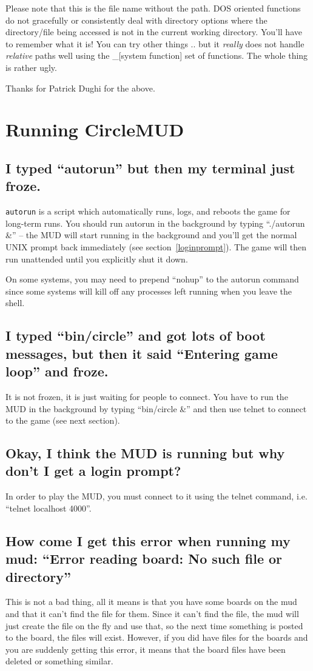 \documentclass[11pt]{article}
\begin{document}
Please note that this is the file name without the path.  DOS oriented functions do not gracefully or consistently deal with directory options where the directory/file being accessed is not in the current working directory. You'll have to remember what it is! You can try other things .. but it {\em really} does not handle {\em relative} paths well using the \_[system function] set of functions.  The whole thing is rather ugly.
\par
Thanks for Patrick Dughi for the above.

\section{Running CircleMUD}
\subsection{I typed ``autorun'' but then my terminal just froze.}
\texttt{autorun} is a script which automatically runs, logs, and reboots the game for long-term runs.  You should run autorun in the background by typing ``./autorun \&'' -- the MUD will start running in the background and you'll get the normal UNIX prompt back immediately (see section~\vref{loginprompt}). The game will then run unattended until you explicitly shut it down.
\par
On some systems, you may need to prepend ``nohup'' to the autorun command since some systems will kill off any processes left running when you leave the shell.

\subsection{I typed ``bin/circle'' and got lots of boot messages, but then it said ``Entering game loop'' and froze.}
It is not frozen, it is just waiting for people to connect.  You have to run the MUD in the background by typing ``bin/circle \&'' and then use telnet to connect to the game (see next section). 

\subsection{Okay, I think the MUD is running but why don't I get a login prompt?}\label{loginprompt}
In order to play the MUD, you must connect to it using the telnet command, i.e. ``telnet localhost 4000''. 

\subsection{How come I get this error when running my mud: ``Error reading board: No such file or directory''}
This is not a bad thing, all it means is that you have some boards on the mud and that it can't find the file for them.  Since it can't find the file, the mud will just create the file on the fly and use that, so the next time something is posted to the board, the files will exist. However, if you did have files for the boards and you are suddenly getting this error, it means that the board files have been deleted or something similar.
\end{document}
